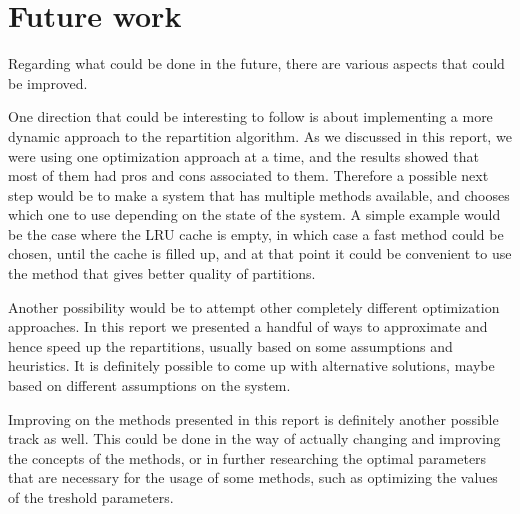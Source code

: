 \section{Future work}\label{sec:future-work}
Regarding what could be done in the future, there are various aspects that could be improved. 

One direction that could be interesting to follow is about implementing a more dynamic approach to the repartition algorithm. As we discussed in this report, we were using one optimization approach at a time, and the results showed that most of them had pros and cons associated to them. Therefore a possible next step would be to make a system that has multiple methods available, and chooses which one to use depending on the state of the system. A simple example would be the case where the LRU cache is empty, in which case a fast method could be chosen, until the cache is filled up, and at that point it could be convenient to use the method that gives better quality of partitions.

Another possibility would be to attempt other completely different optimization approaches. In this report we presented a handful of ways to approximate and hence speed up the repartitions, usually based on some assumptions and heuristics. It is definitely possible to come up with alternative solutions, maybe based on different assumptions on the system.

Improving on the methods presented in this report is definitely another possible track as well. This could be done in the way of actually changing and improving the concepts of the methods, or in further researching the optimal parameters that are necessary for the usage of some methods, such as optimizing the values of the treshold parameters.


